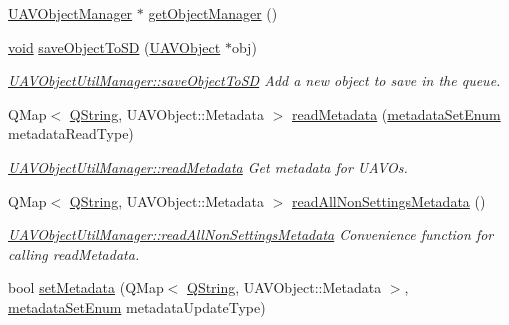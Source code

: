 \begin{DoxyCompactItemize}
\item 
\hyperlink{class_u_a_v_object_manager}{\-U\-A\-V\-Object\-Manager} $\ast$ \hyperlink{group___u_a_v_objects_plugin_ga9a99c93b8210149fd59246e2648a9c59}{get\-Object\-Manager} ()
\item 
\hyperlink{group___u_a_v_objects_plugin_ga444cf2ff3f0ecbe028adce838d373f5c}{void} \hyperlink{group___u_a_v_object_util_plugin_ga007cecfcbf4a9d18c1f2c9ec13de4222}{save\-Object\-To\-S\-D} (\hyperlink{class_u_a_v_object}{\-U\-A\-V\-Object} $\ast$obj)
\begin{DoxyCompactList}\small\item\em \hyperlink{group___u_a_v_object_util_plugin_ga007cecfcbf4a9d18c1f2c9ec13de4222}{\-U\-A\-V\-Object\-Util\-Manager\-::save\-Object\-To\-S\-D} \-Add a new object to save in the queue. \end{DoxyCompactList}\item 
\-Q\-Map$<$ \hyperlink{group___u_a_v_objects_plugin_gab9d252f49c333c94a72f97ce3105a32d}{\-Q\-String}, \*
\-U\-A\-V\-Object\-::\-Metadata $>$ \hyperlink{group___u_a_v_object_util_plugin_gac4fbb0efd0a309169dea095945710ed3}{read\-Metadata} (\hyperlink{group___u_a_v_objects_plugin_ga3f0971e47d6ebe87f97939435cd03da3}{metadata\-Set\-Enum} metadata\-Read\-Type)
\begin{DoxyCompactList}\small\item\em \hyperlink{group___u_a_v_object_util_plugin_gac4fbb0efd0a309169dea095945710ed3}{\-U\-A\-V\-Object\-Util\-Manager\-::read\-Metadata} \-Get metadata for \-U\-A\-V\-Os. \end{DoxyCompactList}\item 
\-Q\-Map$<$ \hyperlink{group___u_a_v_objects_plugin_gab9d252f49c333c94a72f97ce3105a32d}{\-Q\-String}, \*
\-U\-A\-V\-Object\-::\-Metadata $>$ \hyperlink{group___u_a_v_object_util_plugin_ga1bc82b9cb256ba0c3974bab7489aba4a}{read\-All\-Non\-Settings\-Metadata} ()
\begin{DoxyCompactList}\small\item\em \hyperlink{group___u_a_v_object_util_plugin_ga1bc82b9cb256ba0c3974bab7489aba4a}{\-U\-A\-V\-Object\-Util\-Manager\-::read\-All\-Non\-Settings\-Metadata} \-Convenience function for calling read\-Metadata. \end{DoxyCompactList}\item 
bool \hyperlink{group___u_a_v_object_util_plugin_gab813cc6401727303f0787527bbd29ad1}{set\-Metadata} (\-Q\-Map$<$ \hyperlink{group___u_a_v_objects_plugin_gab9d252f49c333c94a72f97ce3105a32d}{\-Q\-String}, \-U\-A\-V\-Object\-::\-Metadata $>$, \hyperlink{group___u_a_v_objects_plugin_ga3f0971e47d6ebe87f97939435cd03da3}{metadata\-Set\-Enum} metadata\-Update\-Type)

\end{DoxyCompactItemize}
